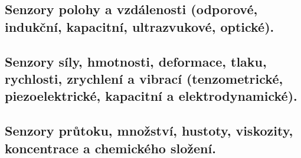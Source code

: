 \newpage
\subsection{Senzory polohy a vzdálenosti (odporové, indukční, kapacitní, ultrazvukové, optické).}

\newpage
\subsection{Senzory síly, hmotnosti, deformace, tlaku, rychlosti, zrychlení a vibrací (tenzometrické, piezoelektrické, kapacitní a elektrodynamické).}

\newpage
\subsection{Senzory průtoku, množství, hustoty, viskozity, koncentrace a chemického složení.}
